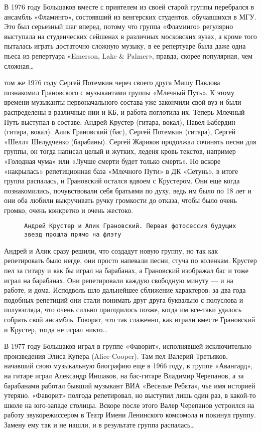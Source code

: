 В 1976 году Большаков вместе с приятелем из своей старой группы перебрался в ансамбль «Фламинго», состоявший из
венгерских студентов, обучавшихся в МГУ. Это был серьезный шаг вперед, потому что группа «Фламинго» регулярно выступала
на студенческих сейшенах в различных московских вузах, а кроме того пыталась играть достаточно сложную музыку, в ее
репертуаре была даже одна пьеса из репертуара «Emerson, Lake \& Palmer», правда, скорее популярная, чем сложная\ldots

 том же 1976 году Сергей Потемкин через своего друга Мишу Павлова познакомил Грановского с музыкантами группы
«Млечный Путь». К этому времени музыканты первоначального состава уже закончили свой вуз и были распределены в различные
нии и КБ, и работа поглотила их. Теперь Млечный Путь выступал в составе. Андрей Крустер (гитара, вокал), Павел Бабердин
(гитара, вокал). Алик Грановский (бас), Сергей Потемкин (гитара), Сергей «Шелл» Шелудченко (барабаны). Сергей Жариков
продолжал сочинять песни для группы, он тогда написал целый и жутких, леденя кровь текстов, например «Голодная чума» или
«Лучше смерти будет только смерть». Но вскоре «накрылась» репетиционная база «Млечного Пути» в ДК «Сетунь», в итоге
группа распалась, и Грановский остался вдвоем с Крустером. Они еще когда познакомились, почувствовали себя братьями по
духу, ведь им было по 18 лет и они оба любили выкручивать ручку громкости до отказа, чтобы было очень громко, очень
конкретно и очень жестоко.

\begin{figure}[h]
    \centering
    \caption{\texttt{Андрей Крустер и Алик Грановский. Первая фотосессия будущих звезд прошла прямо на флэту}}
\end{figure}

Андрей и Алик сразу решили, что создадут новую группу, но так как репетировать было негде, они просто напевали песни,
стуча по коленкам. Крустер пел за гитару и как бы играл на барабанах, а Грановский изображал бас и тоже играл на
барабанах. Они репетировали каждую свободную минуту — и на работе, и дома. Исподволь шло дальнейшее сближение
характеров: за два года подобных репетиций они стали понимать друг друга буквально с полуслова и полувзгляда, что очень
сильно пригодилось позже, когда им все-таки удалось собрать свой ансамбль. Говорят, что так слаженно, как играли вместе
Грановский и Крустер, тогда не играл никто\ldots

В 1977 году Большаков играл в группе «Фаворит», исполнявшей исключительно произведения Элиса Купера (Alice Cooper). Там
пел Валерий Третьяков, начавший свою музыкальную биографию еще в 1966 году, в группе «Авангард», на гитаре играл
Александр Иншаков, на бас-гитаре Владимир Черепанов, а за барабанами работал бывший музыкант ВИА «Веселые Ребята», чье
имя историей утеряно. «Фаворит» полгода репетировал, но выступил лишь один раз, в какой-то школе на юго-западе столицы.
Вскоре после этого Валер Черепанов устроился на работу звукорежиссером в Театр Имени Ленинского комсомола и покинул
группу. Замену ему так и не нашли, и в результате группа распалась\ldots

